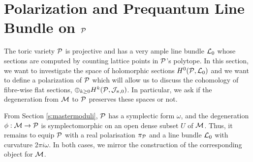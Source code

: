 
	 
\section{Polarization and Prequantum Line Bundle on $\mathcal{P}$}
	\label{s:l0-def}
	The toric variety $\mathcal{P}$ is projective and has a very ample line bundle $\mathcal{L}_0$ whose sections are computed by counting lattice points in $\mathcal{P}$'s polytope. In this section, we want to investigate the space of holomorphic sections $H^0(\mathcal{P},\mathcal{L}_0)$ and we want to define a polarization of $\mathcal{P}$ which will allow us to discuss the cohomology of fibre-wise flat sections, $\oplus_{k\geq 0}H^k(\mathcal{P}, \mathcal{J}_{\pi,0})$. In particular, we ask if the degeneration from $\mathcal{M}$ to $\mathcal{P}$ preserves these spaces or not.
	
	From Section \ref{s:mastermoduli}, $\mathcal{P}$ has a symplectic form $\omega$, and the degeneration $\phi:\mathcal{M}\to \mathcal{P}$ is symplectomorphic on an open dense subset $U$ of $\mathcal{M}$. Thus, it remains to equip $\mathcal{P}$ with a real polarisation $\pi_{\mathcal{P}}$ and a line bundle $\mathcal{L}_0$ with curvature $2\pi i \omega$. In both cases, we mirror the construction of the corresponding object for $\mathcal{M}$.
	
